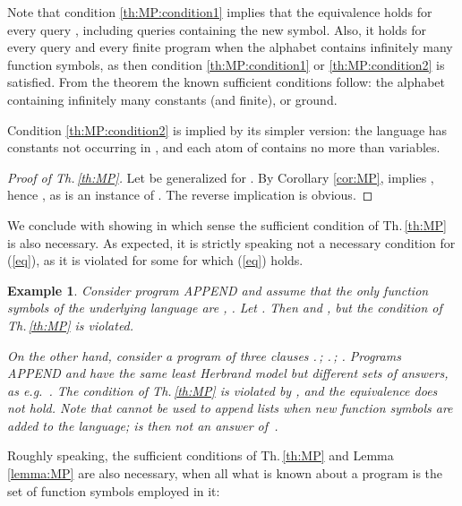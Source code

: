 \documentclass[a4paper]{tlp2}
\newtheorem{example}[theorem]{Example}
\begin{document}
Note that condition \ref{th:MP:condition1}
 implies that the equivalence holds for every query ,
including queries containing the new symbol.
Also, it holds for every query  and every finite program  when the
alphabet contains infinitely many function symbols, as then 
condition  \ref{th:MP:condition1} or \ref{th:MP:condition2} is satisfied.
From the theorem the known sufficient conditions follow: 
the alphabet containing infinitely many constants (and  finite),
or  ground.



Condition \ref{th:MP:condition2}
is implied by its simpler version:
the language has  constants not occurring in , 
 and each atom of  contains no more than  variables.


\begin{proof}[Proof of Th.\,\ref{th:MP}]
Let  be  generalized for .
By Corollary \ref{cor:MP},
  implies , hence , as  is an
instance of .
The reverse implication is obvious.
\end{proof}









We conclude with showing in which sense
the sufficient condition of Th.\,\ref{th:MP}
is also necessary.  As expected, it is strictly speaking not a necessary
condition for (\ref{eq}), 
as it is violated for some  for which (\ref{eq}) holds. 


\begin{example}


\noindent
Consider program APPEND and assume that the only function symbols of the
underlying language are , 
.
 Let .
Then  and , 
but the condition of Th.\,\ref{th:MP} is violated.

On the other hand, consider a program  of three clauses 
.\,;
{\small
.\,;
\hspace{0pt plus .5ex}.
}
Programs \mbox{APPEND} and  have the same least Herbrand model but
different sets of answers,
as e.g.\ .
The condition of Th.\,\ref{th:MP} is violated by , and the equivalence
does not hold.
Note that  cannot be used to append lists when new function symbols are
added to the language;  is then not an answer of~.
\sloppy
\end{example}






Roughly speaking, 
the sufficient conditions of Th.\,\ref{th:MP} and Lemma \ref{lemma:MP}
are also necessary, 
when all what is known about a program is the set of function
symbols employed in it:
\end{document}
